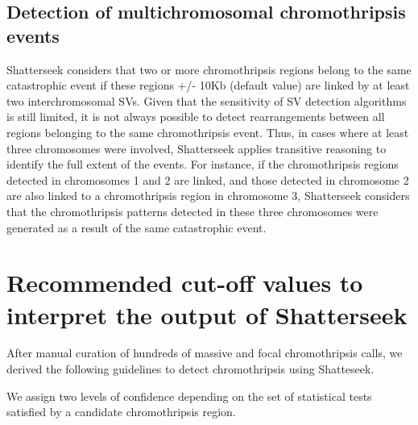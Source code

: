 \documentclass[twoside,a4wide,11pt]{article}\usepackage[]{graphicx}\usepackage[]{color}
\begin{document}
\subsection{Detection of multichromosomal chromothripsis events}
Shatterseek considers that two or more  chromothripsis regions belong to the same 
catastrophic event if these regions +/- 10Kb (default value) are linked by at least two interchromosomal SVs.
Given that the sensitivity of SV detection algorithms is still limited,
it is not always possible to detect rearrangements between all regions belonging to the same chromothripsis event.
Thus, in cases where at least three chromosomes were involved, 
Shatterseek applies transitive reasoning to identify the full extent of the events. 
For instance, if the chromothripsis regions detected in chromosomes 1 and 2 are linked, and those detected in chromosome 2 are also linked to a chromothripsis region in chromosome 3, Shatterseek considers that the chromothripsis patterns detected in these three chromosomes were generated as a result of the same catastrophic event.



\section{Recommended cut-off values to interpret the output of Shatterseek}

After manual curation of hundreds of massive and focal chromothripsis calls, 
we derived the following guidelines to detect chromothripsis using Shatteseek.

We assign two levels of confidence depending on the set of statistical tests
satisfied by a candidate chromothripsis region.
\end{document}
